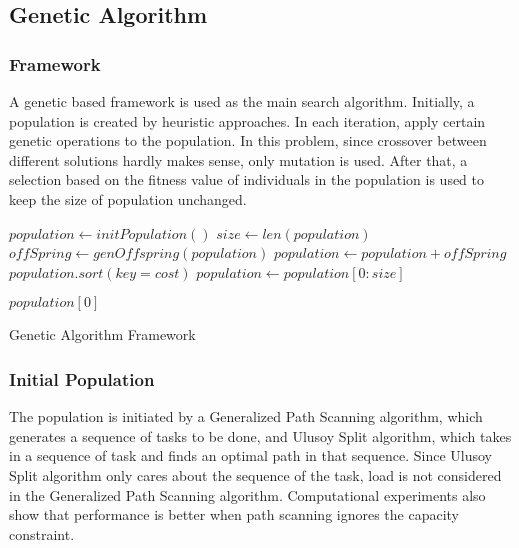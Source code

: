 \documentclass[conference]{IEEEtran}
\begin{document}
\subsection{Genetic Algorithm}
    \subsubsection{Framework}
    A genetic based framework is used as the main search algorithm. 
    Initially, a population is created by heuristic approaches. In each iteration, apply certain genetic operations to the population. In this problem, since crossover between different solutions hardly makes sense, only mutation is used. After that, a selection based on the fitness value of individuals in the population is used to keep the size of population unchanged.
    \begin{algorithm}[H]
        \begin{algorithmic}[1]
            \State $population \gets initPopulation()$
            \State $size \gets len(population)$
                \State $offSpring \gets genOffspring(population)$
                \State $population \gets population + offSpring$
                \State $population.sort(key = cost)$
                \State $population \gets population[0:size]$
            \EndWhile
            
            \Return $population[0]$

        
        \end{algorithmic}
        \caption{Genetic Algorithm Framework}
    \end{algorithm}
    \subsubsection{Initial Population}
    
    The population is initiated by a Generalized Path Scanning algorithm, which generates a sequence of tasks to be done, and Ulusoy Split algorithm, which takes in a sequence of task and finds an optimal path in that sequence. Since Ulusoy Split algorithm only cares about the sequence of the task, load is not considered in the Generalized Path Scanning algorithm. Computational experiments also show that performance is better when path scanning ignores the capacity constraint.
\end{document}
